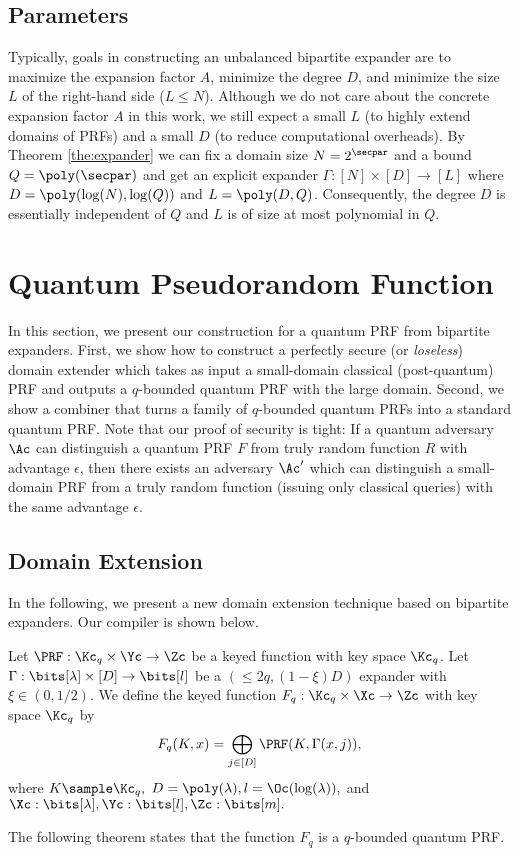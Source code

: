 \subsection{Parameters}

Typically, goals in constructing an unbalanced bipartite expander are to maximize the expansion factor $A$, minimize the degree $D$, and minimize the size $L$ of the right-hand side ($L\leq N$). Although we do not care about the concrete expansion factor $A$ in this work, we still expect a small $L$ (to highly extend domains of PRFs) and a small $D$ (to reduce computational overheads). By Theorem \ref{the:expander} we can fix a domain size $N = 2^\secpar$ and a bound $Q = \poly(\secpar)$ and get an explicit expander $\Gamma: [N] \times [D] \rightarrow [L]$ where $D = \poly(\log(N),\log(Q))$ and $L = \poly(D,Q)$. Consequently, the degree $D$ is essentially independent of $Q$ and $L$ is of size at most polynomial in $Q$.


\section{Quantum Pseudorandom Function}
In this section, we present our construction for a quantum PRF from bipartite expanders. First, we show how to construct a perfectly secure (or \textit{loseless}) domain extender which takes as input a small-domain classical (post-quantum) PRF and outputs a $q$-bounded quantum PRF with the large domain. Second, we show a combiner that turns a family of $q$-bounded quantum PRFs into a standard quantum PRF. Note that our proof of security is tight: If a quantum adversary $\Ac$ can distinguish a quantum PRF $F$ from truly random function $R$ with advantage $\epsilon$, then there exists an adversary $\Ac'$ which can distinguish a small-domain PRF from a truly random function (issuing only classical queries) with the same advantage $\epsilon$.

\subsection{Domain Extension}
In the following, we present a new domain extension technique based on bipartite expanders. Our compiler is shown below.
\begin{construction}\label{con:domain-extension}
	Let $\PRF: \Kc_q \times \Yc \to \Zc$ be a keyed function with key space $\Kc_q$. Let $\Gamma: \bits[\lambda] \times [D] \to \bits[l]$ be a $(\le 2q, (1-\xi)D)$ expander with $\xi\in (0,1/2)$. We define the keyed function $F_q:\Kc_q \times \Xc \to \Zc$ with key space $\Kc_q$ by $$F_q(K,x)=\bigoplus_{j\in [D]} \PRF(K,\Gamma(x,j)),$$ where $K\sample \Kc_q,$ $D=\poly(\lambda), l=\Oc(\log(\lambda)),$ and $\Xc:\bits[\lambda],\Yc:\bits[l],\Zc:\bits[m].$
\end{construction}
%
The following theorem states that the function $F_q$ is  a $q$-bounded quantum PRF.

